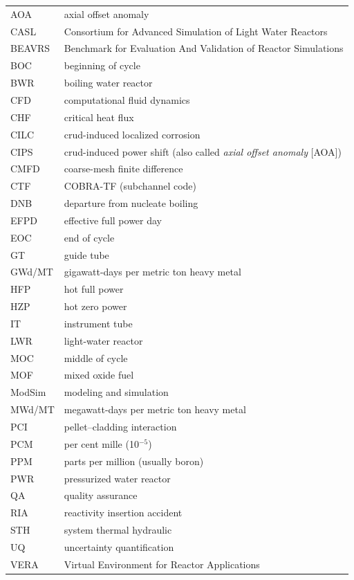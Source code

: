 \documentclass{vera-ornltm}
\begin{document}
\begin{table}[htb]
\begin{tabular}{ll}
  AOA     & axial offset anomaly \\
  CASL    & Consortium for Advanced Simulation of Light Water Reactors \\
  BEAVRS  & Benchmark for Evaluation And Validation of Reactor Simulations \\
  BOC     & beginning of cycle \\
  BWR     & boiling water reactor \\
  CFD     & computational fluid dynamics \\
  CHF     & critical heat flux \\
  CILC    & crud-induced localized corrosion \\
  CIPS    & crud-induced power shift (also called \textit{axial offset anomaly} [AOA]) \\
  CMFD    & coarse-mesh finite difference \\
  CTF     & COBRA-TF (subchannel code) \\
  DNB     & departure from nucleate boiling \\
  EFPD    & effective full power day \\
  EOC     & end of cycle \\
  GT      & guide tube \\
  GWd/MT  & gigawatt-days per metric ton heavy metal \\
  HFP     & hot full power \\
  HZP     & hot zero power \\
  IT      & instrument tube \\
  LWR     & light-water reactor \\
  MOC     & middle of cycle \\
  MOF     & mixed oxide fuel \\
  ModSim  & modeling and simulation \\
  MWd/MT  & megawatt-days per metric ton heavy metal \\
  PCI     & pellet--cladding interaction \\
  PCM     & per cent mille (10$^{-5}$) \\
  PPM     & parts per million (usually boron) \\
  PWR     & pressurized water reactor \\
  QA      & quality assurance \\
  RIA     & reactivity insertion accident \\
  STH     & system thermal hydraulic \\
  UQ      & uncertainty quantification \\
  VERA    & Virtual Environment for Reactor Applications \\
\end{tabular}
\end{table}
\end{document}
